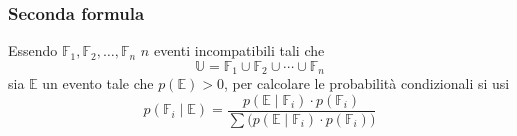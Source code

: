 \subsubsection{Seconda formula}
Essendo $\mathbb{F}_1, \mathbb{F}_2,\dotsc,\mathbb{F}_n$ $n$ eventi incompatibili tali che
\begin{equation*}
  \mathbb{U} = \mathbb{F}_1\cup\mathbb{F}_2\cup\dotsb\cup\mathbb{F}_n
\end{equation*}
sia $\mathbb{E}$ un evento tale che $p(\mathbb{E})>0$, per calcolare le probabilità condizionali si
usi
\begin{equation*}
  p\left(\mathbb{F}_i\mid\mathbb{E}\right) =
  \frac{p\left(\mathbb{E}\mid\mathbb{F}_i\right)\cdot p(\mathbb{F}_i)}
  {\sum\big(p\left(\mathbb{E}\mid\mathbb{F}_i\right)\cdot p(\mathbb{F}_i)\big)}
\end{equation*}
